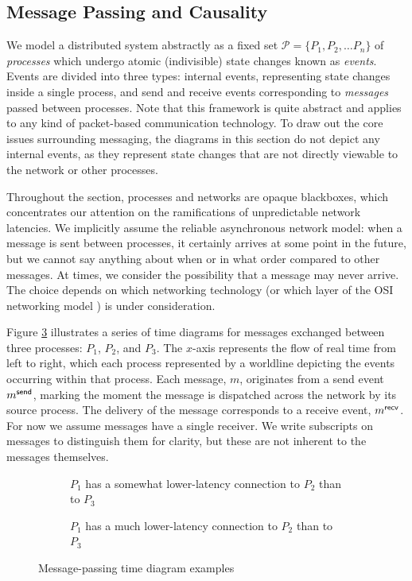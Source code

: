 \documentclass[]             %
{NASA}                       %
\theoremstyle{definition}
\begin{document}
\subsection{Message Passing and Causality}
\label{ssec:message-passing}
We model a distributed system abstractly as a fixed set
$\mathcal{P} = \{P_1, P_2, \ldots P_n\}$ of \emph{processes} which
undergo atomic (indivisible) state changes known as
\emph{events}. Events are divided into three types: internal events,
representing state changes inside a single process, and send and
receive events corresponding to \emph{messages} passed between
processes. Note that this framework is quite abstract and applies to
any kind of packet-based communication technology. To draw out the
core issues surrounding messaging, the diagrams in this section do not
depict any internal events, as they represent state changes that are
not directly viewable to the network or other processes.

Throughout the section, processes and networks are opaque blackboxes,
which concentrates our attention on the ramifications of unpredictable
network latencies. We implicitly assume the reliable asynchronous
network model: when a message is sent between processes, it certainly
arrives at some point in the future, but we cannot say anything about
when or in what order compared to other messages. At times, we
consider the possibility that a message may never arrive. The choice
depends on which networking technology (or which layer of the OSI
networking model \cite{1983:osi-reference-model}) is under
consideration.

Figure \ref{fig:message-latencies} illustrates a series of time
diagrams for messages exchanged between three processes: $P_1$, $P_2$,
and $P_3$. The $x$-axis represents the flow of real time from left to
right, which each process represented by a worldline depicting the
events occurring within that process. Each message, $m$, originates
from a send event $m_{}^{\mathsf{send}}$, marking the moment the message is
dispatched across the network by its source process. The delivery of
the message corresponds to a receive event, $m_{}^{\mathsf{recv}}$. For now we
assume messages have a single receiver. We write subscripts on
messages to distinguish them for clarity, but these are not inherent
to the messages themselves.

\begin{figure}[p]
  \setlength\belowcaptionskip{5ex}
  \begin{subfigure}{1\textwidth}
    \centering
    
    \caption{$P_1$ has a somewhat lower-latency connection to $P_2$ than to $P_3$}
    \label{fig:message-latencies-a}
  \end{subfigure}
  \begin{subfigure}{1\textwidth}
    \centering 
    \caption{$P_1$ has a much lower-latency connection to $P_2$ than to $P_3$}
    \label{fig:message-latencies-b}
  \end{subfigure}
  \caption{Message-passing time diagram examples}
  \label{fig:message-latencies}
\end{figure}
\end{document}
